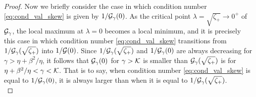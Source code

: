 \documentclass[a4paper,10pt]{article}
\begin{document}
{\begin{itemize}
\begin{proof}
Now we briefly consider the case in which condition number \eqref{eq:cond_val_skew} is given by $1/{\cal G}_{\gamma}(0)$. As the critical point $\lambda = \sqrt{\zeta_+} \to 0^+$ of ${\cal G}_{\gamma}$, the local maximum at $\lambda = 0$ becomes a local minimum, and it is precisely this case in which condition number \eqref{eq:cond_val_skew} transitions from $1/{\cal G}_{\gamma}(\sqrt{\zeta_+})$ into $1/{\cal G}(0)$. Since $1/{\cal G}_{\gamma}(\sqrt{\zeta_+})$ and $1/{\cal G}_{\gamma}(0)$ are always decreasing for $\gamma > \eta + \beta^2/\eta$, it follows that ${\cal G}_{\gamma}(0)$ for $\gamma > {\cal K}$ is smaller than ${\cal G}_{\gamma}(\sqrt{\zeta_+})$ is for $\eta + \beta^2/\eta < \gamma < {\cal K}$. That is to say, when condition number \eqref{eq:cond_val_skew} is equal to $1/{\cal G}_{\gamma}(0)$, it is always larger than when it is equal to $1/{\cal G}_{\gamma}(\sqrt{\zeta_+})$.\\


\end{proof}
\end{itemize}}
\end{document}
